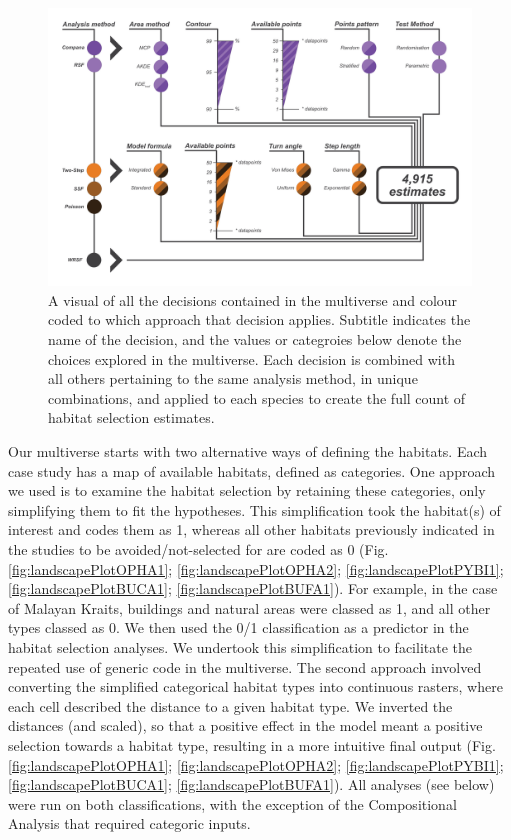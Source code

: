 \documentclass[10pt,a4paper]{article}
\begin{document}
\begin{figure}
\includegraphics[width=1\linewidth]{../ext_images/decisions_visual} \caption{A visual of all the decisions contained in the multiverse and colour coded to which approach that decision applies. Subtitle indicates the name of the decision, and the values or categroies below denote the choices explored in the multiverse. Each decision is combined with all others pertaining to the same analysis method, in unique combinations, and applied to each species to create the full count of habitat selection estimates.}\label{fig:decisionsFigure}
\end{figure}

Our multiverse starts with two alternative ways of defining the habitats.
Each case study has a map of available habitats, defined as categories.
One approach we used is to examine the habitat selection by retaining these categories, only simplifying them to fit the hypotheses.
This simplification took the habitat(s) of interest and codes them as 1, whereas all other habitats previously indicated in the studies to be avoided/not-selected for are coded as 0 (Fig. \ref{fig:landscapePlotOPHA1}; \ref{fig:landscapePlotOPHA2}; \ref{fig:landscapePlotPYBI1}; \ref{fig:landscapePlotBUCA1}; \ref{fig:landscapePlotBUFA1}).
For example, in the case of Malayan Kraits, buildings and natural areas were classed as 1, and all other types classed as 0.
We then used the 0/1 classification as a predictor in the habitat selection analyses.
We undertook this simplification to facilitate the repeated use of generic code in the multiverse.
The second approach involved converting the simplified categorical habitat types into continuous rasters, where each cell described the distance to a given habitat type.
We inverted the distances (and scaled), so that a positive effect in the model meant a positive selection towards a habitat type, resulting in a more intuitive final output (Fig. \ref{fig:landscapePlotOPHA1}; \ref{fig:landscapePlotOPHA2}; \ref{fig:landscapePlotPYBI1}; \ref{fig:landscapePlotBUCA1}; \ref{fig:landscapePlotBUFA1}).
All analyses (see below) were run on both classifications, with the exception of the Compositional Analysis that required categoric inputs.
\end{document}
